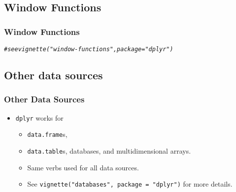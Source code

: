 \documentclass{beamer}\usepackage[]{graphicx}\usepackage[]{color}
\makeatletter
\newcommand{\hlcom}[1]{\textcolor[rgb]{0.678,0.584,0.686}{\textit{#1}}}%
\newenvironment{kframe}{%
 \def\at@end@of@kframe{}%
 \ifinner\ifhmode%
  \def\at@end@of@kframe{\end{minipage}}%
  \begin{minipage}{\columnwidth}%
 \fi\fi%
 \def\FrameCommand##1{\hskip\@totalleftmargin \hskip-\fboxsep
 \colorbox{shadecolor}{##1}\hskip-\fboxsep
     \hskip-\linewidth \hskip-\@totalleftmargin \hskip\columnwidth}%
 \MakeFramed {\advance\hsize-\width
   \@totalleftmargin\z@ \linewidth\hsize
   \@setminipage}}%
 {\par\unskip\endMakeFramed%
 \at@end@of@kframe}
\newenvironment{knitrout}{}{} %
\makeatother
\begin{document}
\subsection{Window Functions}%
\begin{frame}[fragile]
  \frametitle{Window Functions}
\begin{knitrout}\footnotesize
{}\color{fgcolor}\begin{kframe}
\begin{alltt}
\hlcom{# see vignette("window-functions", package = "dplyr")}
\end{alltt}
\end{kframe}
\end{knitrout}
\end{frame} 

\subsection{Other data sources}%
\begin{frame}[fragile]
  \frametitle{Other Data Sources}
  \begin{itemize}
    \item {\tt dplyr} works for 
      \begin{itemize}
        \item {\tt data.frame}s, \item {\tt data.table}s,
          databases, and multidimensional arrays.
        \item Same verbs used for all data sources.
        \item See {\tt vignette("databases", package =
          "dplyr")} for more details.

      \end{itemize}
  \end{itemize}
\end{frame} 
\end{document}
